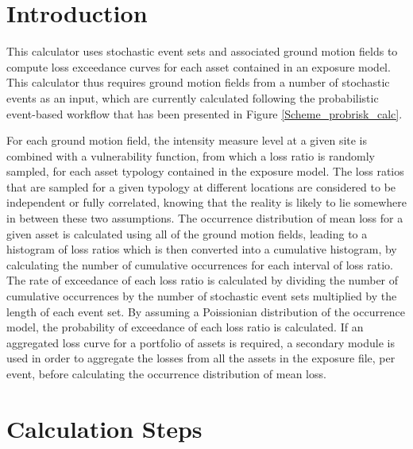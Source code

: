 \section{Introduction}
This calculator uses stochastic event sets and associated ground motion fields to compute loss exceedance curves for each asset contained in an exposure model. This calculator thus requires ground motion fields from a number of stochastic events as an input, which are currently calculated following the probabilistic event-based workflow that has been presented in Figure \ref{Scheme_probrisk_calc}.

For each ground motion field, the intensity measure level at a given site is combined with a vulnerability function, from which a loss ratio is randomly sampled, for each asset typology contained in the exposure model. The loss ratios that are sampled for a given typology at different locations are considered to be independent or fully correlated, knowing that the reality is likely to lie somewhere in between these two assumptions. The occurrence distribution of mean loss for a given asset is calculated using all of the ground motion fields, leading to a histogram of loss ratios which is then converted into a cumulative histogram, by calculating the number of cumulative occurrences for each interval of loss ratio. The rate of exceedance of each loss ratio is calculated by dividing the number of cumulative occurrences by the number of stochastic event sets multiplied by the length of each event set. By assuming a Poissionian distribution of the occurrence model, the probability of exceedance of each loss ratio is calculated. If an aggregated loss curve for a portfolio of assets is required, a secondary module is used in order to aggregate the losses from all the assets in the exposure file, per event, before calculating the occurrence distribution of mean loss. 

\section{Calculation Steps}


